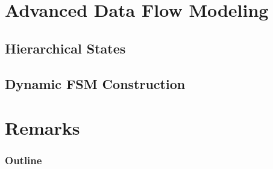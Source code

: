 \section{Advanced Data Flow Modeling}
\subsection{Hierarchical States}

\subsection{Dynamic FSM Construction}


%
%
%
%
%
%
%

\section{Remarks}
\begin{frame}
  \frametitle{Outline}
\end{frame}

